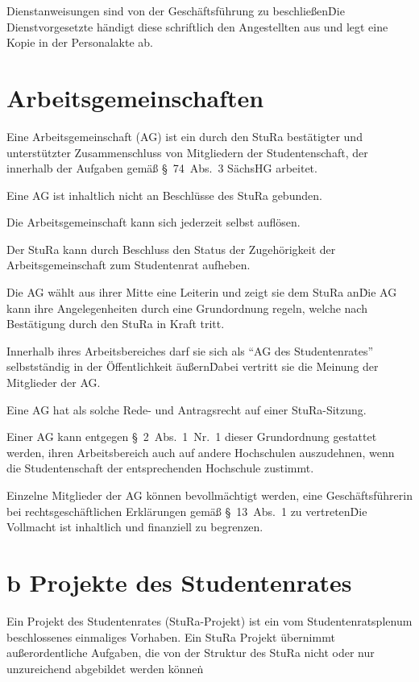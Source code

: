 \begin{multicols}{2}
\Abs \Satz Dienstanweisungen sind von der Geschäftsführung zu beschließen\. Die Dienstvorgesetzte händigt diese schriftlich den Angestellten aus und legt eine Kopie in der Personalakte ab.

\setcounter{section}{27}



\section{Arbeitsgemeinschaften} %

\Abs \Satz Eine Arbeitsgemeinschaft (AG) ist ein durch den StuRa bestätigter und unterstützter Zusammenschluss von Mitgliedern der Studentenschaft, der innerhalb der Aufgaben gemäß §~74~Abs.~3 SächsHG arbeitet.

\Abs \Satz Eine AG ist inhaltlich nicht an Beschlüsse des StuRa gebunden.

\Abs \Satz Die Arbeitsgemeinschaft kann sich jederzeit selbst auflösen.

\Abs \Satz Der StuRa kann durch Beschluss den Status der Zugehörigkeit der Arbeitsgemeinschaft zum Studentenrat aufheben.

\Abs \Satz Die AG wählt aus ihrer Mitte eine Leiterin und zeigt sie dem StuRa an\. Die AG kann ihre Angelegenheiten durch eine Grundordnung regeln, welche nach Bestätigung durch den StuRa in Kraft tritt.

\Abs \Satz Innerhalb ihres Arbeitsbereiches darf sie sich als "`AG des Studentenrates"' selbstständig in der Öffentlichkeit äußern\. Dabei vertritt sie die Meinung der Mitglieder der AG.

\Abs \Satz Eine AG hat als solche Rede- und Antragsrecht auf einer StuRa-Sitzung.

\Abs \Satz Einer AG kann entgegen §~2~Abs.~1~Nr.~1 dieser Grundordnung gestattet werden, ihren Arbeitsbereich auch auf andere Hochschulen auszudehnen, wenn die Studentenschaft der entsprechenden Hochschule zustimmt.

\Abs \Satz Einzelne Mitglieder der AG können bevollmächtigt werden, eine Geschäftsführerin bei rechtsgeschäftlichen Erklärungen gemäß §~13~Abs.~1 zu vertreten\. Die Vollmacht ist inhaltlich und finanziell zu begrenzen.

\setcounter{section}{27}
\section{b Projekte des Studentenrates}


\Abs \Satz Ein Projekt des Studentenrates (StuRa-Projekt) ist ein vom Studentenratsplenum beschlossenes einmaliges Vorhaben. Ein StuRa Projekt übernimmt außerordentliche Aufgaben, die von der Struktur des StuRa nicht oder nur unzureichend abgebildet werden können\.


\end{multicols}
